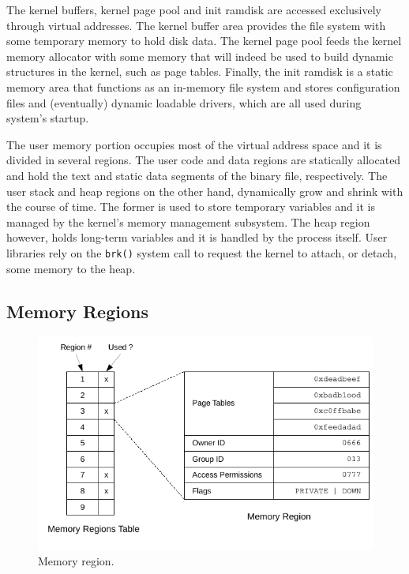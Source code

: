 	The kernel buffers, kernel page pool and init ramdisk are accessed
	exclusively through virtual addresses. The kernel buffer area
	provides the file system with some temporary memory to hold disk
	data. The kernel page pool feeds the kernel memory allocator with
	some memory that will indeed be used to build dynamic structures in
	the kernel, such as page tables. Finally, the init ramdisk is a
	static memory area that functions as an in-memory file system and
	stores configuration files and (eventually) dynamic loadable
	drivers, which are all used during system's startup.

	The user memory portion occupies most of the virtual address space
	and it is divided in several regions. The user code and data regions
	are statically allocated and hold the text and static data segments
	of the binary file, respectively. The user stack and heap regions on
	the other hand, dynamically grow and shrink with the course of time.
	The former is used to store temporary variables and it is managed by
	the kernel's memory management subsystem. The heap region however,
	holds long-term variables and it is handled by the process itself.
	User libraries rely on the \texttt{brk()} system call to request the
	kernel to attach, or detach, some memory to the heap.

\subsection{Memory Regions}

	\begin{figure}[!b]
		\centering
		\includegraphics[scale=0.95]{img/memory-regions}
		\caption{Memory region.}
		\label{figure: memory region}
	\end{figure}

